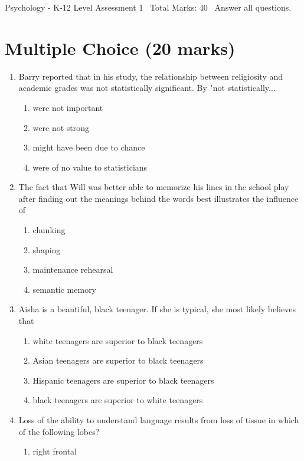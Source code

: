 \documentclass[12pt]{article}
\begin{document}
\begin{center}
Psychology - K-12 Level Assessment 1 \
Total Marks: 40 \
Answer all questions.
\end{center}

\section*{Multiple Choice (20 marks)}
\begin{enumerate}[label=\arabic*.]
\item Barry reported that in his study, the relationship between religiosity and academic grades was not statistically significant. By "not statistically...
\begin{enumerate}[label=(\alph*)]
    \item were not important
    \item were not strong
    \item might have been due to chance
    \item were of no value to statisticians
\end{enumerate}
\item The fact that Will was better able to memorize his lines in the school play after finding out the meanings behind the words best illustrates the influence of
\begin{enumerate}[label=(\alph*)]
    \item chunking
    \item shaping
    \item maintenance rehearsal
    \item semantic memory
\end{enumerate}
\item Aisha is a beautiful, black teenager. If she is typical, she most likely believes that
\begin{enumerate}[label=(\alph*)]
    \item white teenagers are superior to black teenagers
    \item Asian teenagers are superior to black teenagers
    \item Hispanic teenagers are superior to black teenagers
    \item black teenagers are superior to white teenagers
\end{enumerate}
\item Loss of the ability to understand language results from loss of tissue in which of the following lobes?
\begin{enumerate}[label=(\alph*)]
    \item right frontal

\end{enumerate}
\end{enumerate}
\end{document}
